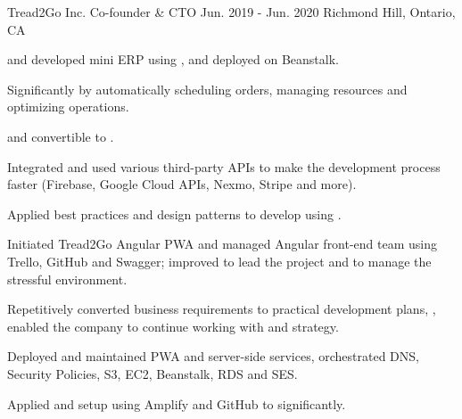\begin{cventries}
  \cventry
    {Tread2Go Inc.} %
    {Co-founder \& CTO} %
    {Jun. 2019 - Jun. 2020} %
    {Richmond Hill, Ontario, CA} %
    {
      \begin{cvitems} %
        \item { and developed mini ERP  using ,  and deployed on  Beanstalk.}
          \begin{cvsubitems}
            \item {Significantly  by automatically scheduling orders, managing resources and optimizing operations.}
            \item { and convertible to .}
            \item {Integrated and used various third-party APIs to make the development process faster  (Firebase, Google Cloud APIs, Nexmo, Stripe and more).}
            \item {Applied best practices and design patterns to develop  using .}
          \end{cvsubitems}
        \item {Initiated Tread2Go Angular PWA and managed Angular front-end team using Trello, GitHub and Swagger; improved  to lead the project and  to manage the stressful environment.}
          \begin{cvsubitems}
            \item {Repetitively converted business requirements to practical development plans, , enabled the company to continue working with  and  strategy.}
          \end{cvsubitems}
        \item {Deployed and maintained PWA and server-side services, orchestrated DNS, Security Policies, S3, EC2, Beanstalk, RDS and SES.}
          \begin{cvsubitems}
            \item {Applied and setup  using Amplify and GitHub to  significantly.}
          \end{cvsubitems}
      \end{cvitems}
    }


\end{cventries}
